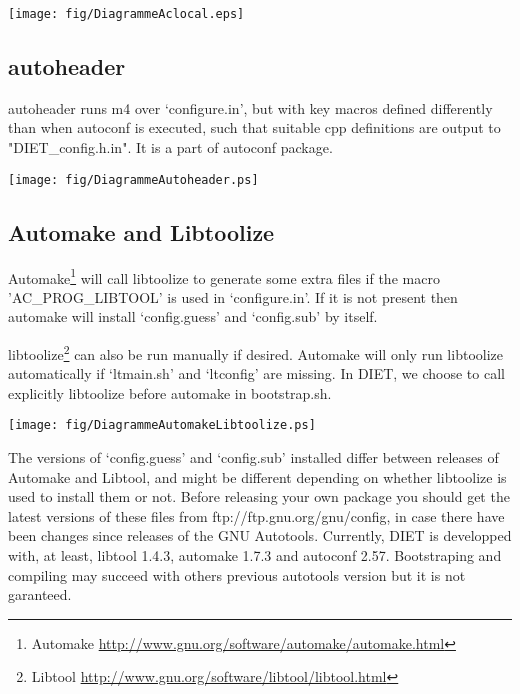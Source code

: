 \begin{center}
\texttt{[image: fig/DiagrammeAclocal.eps]}
\end{center}

\subsection{autoheader}
autoheader runs m4 over `configure.in', but with key macros defined differently
than when autoconf is executed, such that suitable cpp definitions are output
to "DIET\_config.h.in". It is a part of autoconf package.

\begin{center}
\texttt{[image: fig/DiagrammeAutoheader.ps]}
\end{center}

\subsection{Automake and Libtoolize}
Automake\footnote{Automake {\url{http://www.gnu.org/software/automake/automake.html}}} 
will call libtoolize to generate some extra files if the macro 
'AC\_PROG\_LIBTOOL' is used in `configure.in'. If it is not present 
then automake will install `config.guess' and `config.sub' by itself.

libtoolize\footnote{Libtool {\url{http://www.gnu.org/software/libtool/libtool.html}}}
can also be run manually if desired. 
Automake will only run libtoolize automatically if `ltmain.sh' and `ltconfig' 
are missing. In DIET, we choose to call explicitly libtoolize before automake
in bootstrap.sh.

\begin{center}
\texttt{[image: fig/DiagrammeAutomakeLibtoolize.ps]}
\end{center}

The versions of `config.guess' and `config.sub' installed differ between 
releases of Automake and Libtool, and might be different depending on whether 
libtoolize is used to install them or not. Before releasing your own package 
you should get the latest versions of these files from ftp://ftp.gnu.org/gnu/config,
in case there have been changes since releases of the GNU Autotools.
Currently, DIET is developped with, at least, libtool 1.4.3, automake 1.7.3 and 
autoconf 2.57. Bootstraping and compiling may succeed with others previous autotools version
but it is not garanteed.


